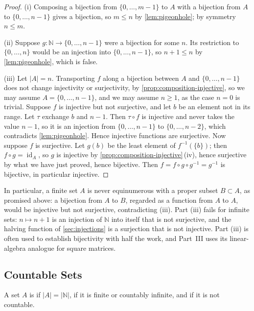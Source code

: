 \begin{proof}
(i) Composing a bijection from $\{0,\ldots,m-1\}$ to $A$ with a bijection from $A$ to $\{0,\ldots,n-1\}$ gives a bijection, so $m\le n$ by \cref{lem:pigeonhole}; by symmetry $n\le m$.

(ii) Suppose $g\colon\mathbb N\to\{0,\ldots,n-1\}$ were a bijection for some $n$. Its restriction to $\{0,\ldots,n\}$ would be an injection into $\{0,\ldots,n-1\}$, so $n+1\le n$ by \cref{lem:pigeonhole}, which is false.

(iii) Let $|A|=n$. Transporting $f$ along a bijection between $A$ and $\{0,\ldots,n-1\}$ does not change injectivity or surjectivity, by \cref{prop:composition-injective}, so we may assume $A=\{0,\ldots,n-1\}$, and we may assume $n\ge1$, as the case $n=0$ is trivial. Suppose $f$ is injective but not surjective, and let $b$ be an element not in its range. Let $\tau$ exchange $b$ and $n-1$. Then $\tau\circ f$ is injective and never takes the value $n-1$, so it is an injection from $\{0,\ldots,n-1\}$ to $\{0,\ldots,n-2\}$, which contradicts \cref{lem:pigeonhole}. Hence injective functions are surjective. Now suppose $f$ is surjective. Let $g(b)$ be the least element of $f^{-1}(\{b\})$; then $f\circ g=\operatorname{id}_A$, so $g$ is injective by \cref{prop:composition-injective}\,(iv), hence surjective by what we have just proved, hence bijective. Then $f=f\circ g\circ g^{-1}=g^{-1}$ is bijective, in particular injective.
\end{proof}

In particular, a finite set $A$ is never equinumerous with a proper subset $B\subset A$, as promised above: a bijection from $A$ to $B$, regarded as a function from $A$ to $A$, would be injective but not surjective, contradicting (iii). Part (iii) fails for infinite sets: $n\mapsto n+1$ is an injection of $\mathbb N$ into itself that is not surjective, and the halving function of \cref{sec:injections} is a surjection that is not injective. Part (iii) is often used to establish bijectivity with half the work, and Part~III uses its linear-algebra analogue for square matrices.

\subsection{Countable Sets}

\begin{definition}
\label{def:countable}
A set $A$ is  if $|A|=|\mathbb N|$,  if it is finite or countably infinite, and  if it is not countable.
\end{definition}

